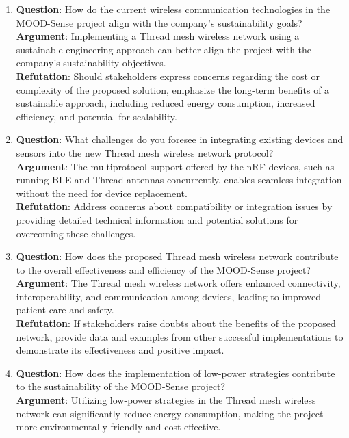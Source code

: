 \begin{enumerate}
    \item \textbf{Question}: How do the current wireless communication technologies in the MOOD-Sense project align with the company's sustainability goals?\\
    \textbf{Argument}: Implementing a Thread mesh wireless network using a sustainable engineering approach can better align the project with the company's sustainability objectives.\\
    \textbf{Refutation}: Should stakeholders express concerns regarding the cost or complexity of the proposed solution, emphasize the long-term benefits of a sustainable approach, including reduced energy consumption, increased efficiency, and potential for scalability.
    \item \textbf{Question}: What challenges do you foresee in integrating existing devices and sensors into the new Thread mesh wireless network protocol?\\
    \textbf{Argument}: The multiprotocol support offered by the nRF devices, such as running BLE and Thread antennas concurrently, enables seamless integration without the need for device replacement.\\
    \textbf{Refutation}: Address concerns about compatibility or integration issues by providing detailed technical information and potential solutions for overcoming these challenges.
    \item \textbf{Question}: How does the proposed Thread mesh wireless network contribute to the overall effectiveness and efficiency of the MOOD-Sense project?\\
    \textbf{Argument}: The Thread mesh wireless network offers enhanced connectivity, interoperability, and communication among devices, leading to improved patient care and safety.\\
    \textbf{Refutation}: If stakeholders raise doubts about the benefits of the proposed network, provide data and examples from other successful implementations to demonstrate its effectiveness and positive impact.
    \item \textbf{Question}: How does the implementation of low-power strategies contribute to the sustainability of the MOOD-Sense project?\\
    \textbf{Argument}: Utilizing low-power strategies in the Thread mesh wireless network can significantly reduce energy consumption, making the project more environmentally friendly and cost-effective.\\

\end{enumerate}
